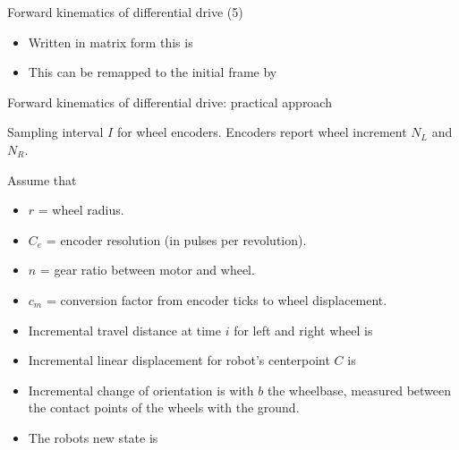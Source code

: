 \documentclass[compress]{beamer}
\begin{document}
\begin{frame}{Forward kinematics of differential drive (5)}

\begin{itemize}
    \item Written in matrix form this is
    \item This can be remapped to the initial frame by
\end{itemize}

\end{frame}

\begin{frame}{Forward kinematics of differential drive: practical
approach}

Sampling interval $I$ for wheel encoders. Encoders report wheel
increment $N_L$ and $N_R$.

Assume that

\begin{itemize}
    \item $r$ = wheel radius.
    \item $C_e$ = encoder resolution (in pulses per revolution).
    \item $n$ = gear ratio between motor and wheel.
    \item $c_m$ = conversion factor from encoder ticks to wheel
  displacement.
\end{itemize}

\end{frame}

\begin{frame}{}

\begin{itemize}
    \item Incremental travel distance at time $i$ for left and right wheel
  is
    \item Incremental linear displacement for robot's centerpoint $C$ is
\end{itemize}

\end{frame}

\begin{frame}{}

\begin{itemize}
    \item Incremental change of orientation is with $b$ the wheelbase,
  measured between the contact points of the wheels with the ground.
    \item The robots new state is
\end{itemize}

\end{frame}
\end{document}
